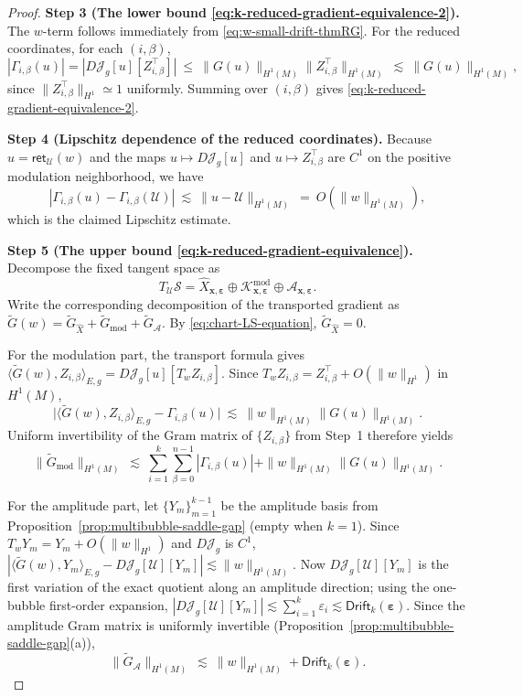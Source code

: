 \documentclass[11pt,reqno,a4paper]{amsart}
\numberwithin{equation}{section}
\theoremstyle{plain}
\theoremstyle{remark}
\theoremstyle{plain}
\begin{document}
\begin{proof}
\smallskip\noindent
\textbf{Step 3 (The lower bound \eqref{eq:k-reduced-gradient-equivalence-2}).}
The $w$-term follows immediately from \eqref{eq:w-small-drift-thmRG}.
For the reduced coordinates, for each $(i,\beta)$,
\[
|\Gamma_{i,\beta}(u)|
=|D\mathcal J_g[u][Z_{i,\beta}^{\top}]|
\ \le\ \|G(u)\|_{H^1(M)}\|Z_{i,\beta}^{\top}\|_{H^1(M)}
\ \lesssim\ \|G(u)\|_{H^1(M)},
\]
since $\|Z_{i,\beta}^{\top}\|_{H^1}\simeq1$ uniformly.
Summing over $(i,\beta)$ gives \eqref{eq:k-reduced-gradient-equivalence-2}.

\smallskip\noindent
\textbf{Step 4 (Lipschitz dependence of the reduced coordinates).}
Because $u=\mathsf{ret}_{\mathcal U}(w)$ and the maps
$u\mapsto D\mathcal J_g[u]$ and $u\mapsto Z_{i,\beta}^{\top}$ are $C^1$
on the positive modulation neighborhood, we have
\[
|\Gamma_{i,\beta}(u)-\Gamma_{i,\beta}(\mathcal U)|
\ \lesssim\ \|u-\mathcal U\|_{H^1(M)}
\ =\ O(\|w\|_{H^1(M)}),
\]
which is the claimed Lipschitz estimate.

\smallskip\noindent
\textbf{Step 5 (The upper bound \eqref{eq:k-reduced-gradient-equivalence}).}
Decompose the fixed tangent space as
\[
T_{\mathcal U}\mathcal S
=\widehat X_{\mathbf x,\boldsymbol\varepsilon}
\oplus \mathcal K^{\mathrm{mod}}_{\mathbf x,\boldsymbol\varepsilon}
\oplus \mathcal A_{\mathbf x,\boldsymbol\varepsilon}.
\]
Write the corresponding decomposition of the transported gradient as
$\widetilde G(w)=\widetilde G_{\widehat X}+\widetilde G_{\mathrm{mod}}+\widetilde G_{\mathcal A}$.
By \eqref{eq:chart-LS-equation}, $\widetilde G_{\widehat X}=0$.

For the modulation part, the transport formula gives
$\langle \widetilde G(w),Z_{i,\beta}\rangle_{E,g}
= D\mathcal J_g[u][T_w Z_{i,\beta}]$.
Since $T_wZ_{i,\beta}=Z_{i,\beta}^{\top}+O(\|w\|_{H^1})$ in $H^1(M)$,
\[
\big|\langle \widetilde G(w),Z_{i,\beta}\rangle_{E,g}-\Gamma_{i,\beta}(u)\big|
\ \lesssim\ \|w\|_{H^1(M)}\|G(u)\|_{H^1(M)}.
\]
Uniform invertibility of the Gram matrix of $\{Z_{i,\beta}\}$ from Step~1 therefore yields
\begin{equation}\label{eq:mod-part-upper}
\|\widetilde G_{\mathrm{mod}}\|_{H^1(M)}
\ \lesssim\ \sum_{i=1}^k\sum_{\beta=0}^{n-1}|\Gamma_{i,\beta}(u)|
+\|w\|_{H^1(M)}\|G(u)\|_{H^1(M)}.
\end{equation}

For the amplitude part, let $\{Y_m\}_{m=1}^{k-1}$ be the amplitude basis from
Proposition~\ref{prop:multibubble-saddle-gap} (empty when $k=1$).
Since $T_wY_m=Y_m+O(\|w\|_{H^1})$ and $D\mathcal J_g$ is $C^1$,
$|\langle \widetilde G(w),Y_m\rangle_{E,g}-D\mathcal J_g[\mathcal U][Y_m]|
\lesssim \|w\|_{H^1(M)}$.
Now $D\mathcal J_g[\mathcal U][Y_m]$ is the first variation of the exact quotient
along an amplitude direction; using the one-bubble first-order expansion,
$|D\mathcal J_g[\mathcal U][Y_m]|\lesssim\sum_{i=1}^k\varepsilon_i
\lesssim\mathsf{Drift}_k(\boldsymbol\varepsilon)$.
Since the amplitude Gram matrix is uniformly invertible
(Proposition~\ref{prop:multibubble-saddle-gap}\textup{(a)}),
\begin{equation}\label{eq:amp-part-upper}
\|\widetilde G_{\mathcal A}\|_{H^1(M)}
\ \lesssim\ \|w\|_{H^1(M)}+\mathsf{Drift}_k(\boldsymbol\varepsilon).
\end{equation}


\end{proof}
\end{document}
